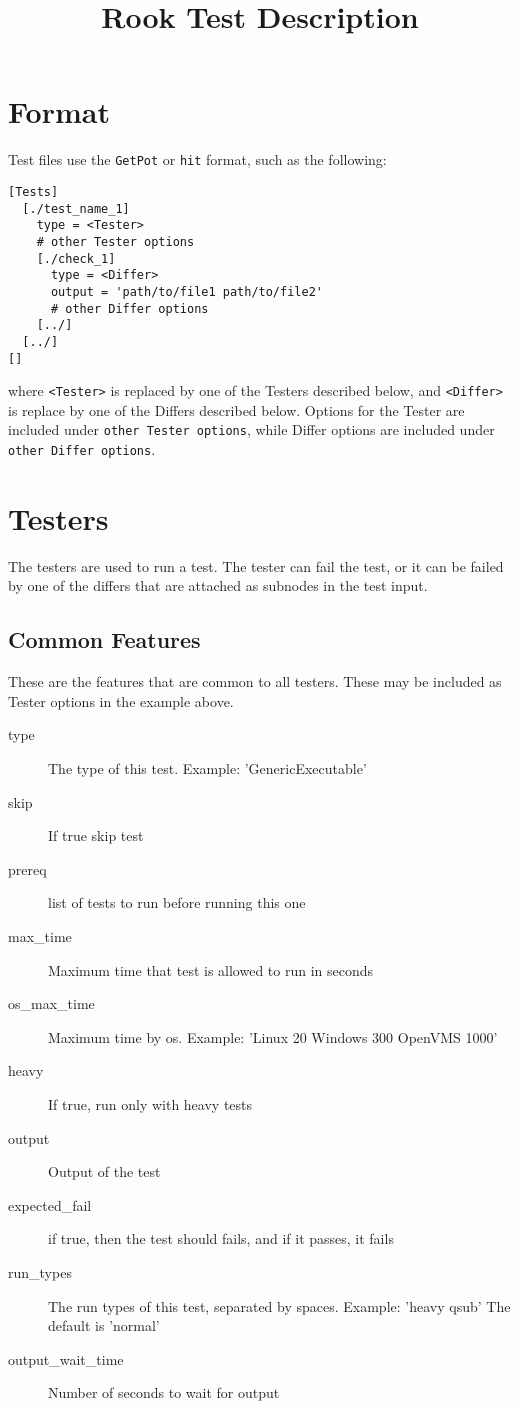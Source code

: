 \documentclass{article}
\title{Rook Test Description}
\begin{document}
\maketitle

\section{Format}
Test files use the \texttt{GetPot} or \texttt{hit} format, such as the following:
\begin{verbatim}
[Tests]
  [./test_name_1]
    type = <Tester>
    # other Tester options
    [./check_1]
      type = <Differ>
      output = 'path/to/file1 path/to/file2'
      # other Differ options
    [../]
  [../]
[]
\end{verbatim}
where \texttt{<Tester>} is replaced by one of the Testers described below, and \texttt{<Differ>}
is replace by one of the Differs described below. Options for the Tester are included under
\texttt{other Tester options}, while Differ options are included under \texttt{other Differ options}.

\section{Testers}

The testers are used to run a test.  The tester can fail the test, or
it can be failed by one of the differs that are attached as subnodes
in the test input.

\subsection{Common Features}

These are the features that are common to all testers. These may be included as Tester options in the
example above.

\begin{description}
  \item[type] The type of this test. Example: 'GenericExecutable'
  \item[skip] If true skip test
  \item[prereq] list of tests to run before running this one
  \item[max\_time] Maximum time that test is allowed to run in seconds
  \item[os\_max\_time] Maximum time by os. Example: 'Linux 20 Windows 300 OpenVMS 1000'
  \item[heavy] If true, run only with heavy tests
  \item[output] Output of the test
  \item[expected\_fail] if true, then the test should fails, and if it passes, it fails
  \item[run\_types] The run types of this test, separated by spaces. Example: 'heavy qsub' The default is 'normal'
  \item[output\_wait\_time] Number of seconds to wait for output
\end{description}
\end{document}
